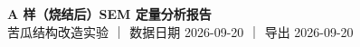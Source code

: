 \documentclass[a4paper, 11pt]{ctexart}
\begin{document}
\begin{center}
{\LARGE\bfseries A 样（烧结后）SEM 定量分析报告}\\[4pt]
{\normalsize 苦瓜结构改造实验 ｜ 数据日期 2026-09-20 ｜ 导出 2026-09-20}
\end{center}


\end{document}
